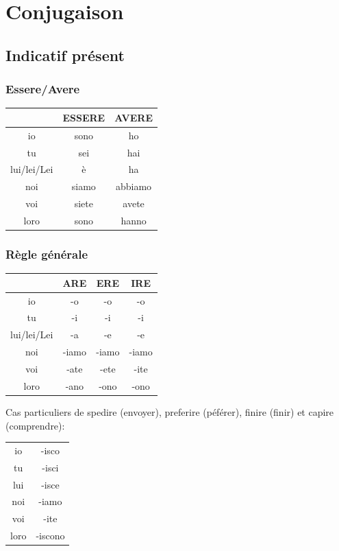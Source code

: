 \documentclass[12pt, openany]{report}
\begin{document}
\chapter{Conjugaison}
\section{Indicatif présent}
\subsection{Essere/Avere}
\begin{center}
    \begin{tabular}{c|c|c}
        & ESSERE & AVERE \\ \hline
        io & sono & ho\\
        tu & sei & hai\\
        lui/lei/Lei & è & ha\\ 
        noi & siamo & abbiamo \\
        voi & siete & avete \\
        loro & sono & hanno\\
    \end{tabular}
\end{center}
\subsection{Règle générale}
\begin{minipage}{.49\textwidth}
    \vspace{.75cm}
    \begin{center}
        \begin{tabular}{c||c|c|c}
            & ARE & ERE & IRE\\
            \hline
            io & -o & -o & -o\\
            tu & -i & -i & -i\\
            lui/lei/Lei & -a & -e & -e\\
            noi & -iamo & -iamo & -iamo\\
            voi & -ate & -ete & -ite\\
            loro & -ano & -ono & -ono\\
        \end{tabular}
    \end{center}
\end{minipage}
\begin{minipage}{.45\textwidth}
    Cas particuliers de spedire (envoyer), preferire (péférer), finire (finir) et capire (comprendre):
    \begin{center}
        \begin{tabular}{c||c}
            io & -isco \\
            tu & -isci \\
            lui & -isce \\
            noi & -iamo \\
            voi & -ite \\
            loro & -iscono \\
        \end{tabular}
    \end{center}
\end{minipage}
\end{document}
